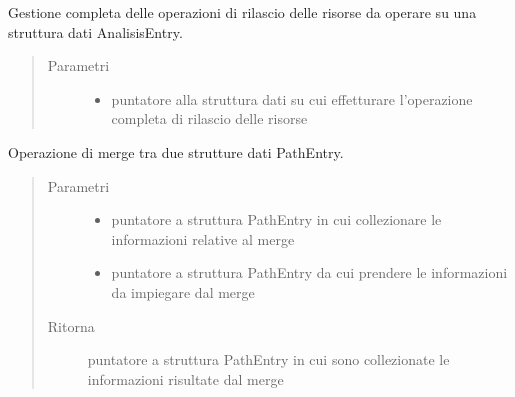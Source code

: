\documentclass[letterpaper,10pt,italian,openany,oneside]{sphinxmanual}
\begin{document}

\begin{fulllineitems}
\label{\detokenize{code/scan:c.freeAnalisis}}
Gestione completa delle operazioni di rilascio delle risorse da operare su una struttura dati AnalisisEntry.
\begin{quote}\begin{description}
\item[{Parametri}] \leavevmode\begin{itemize}
\item {} 
 \textendash{} puntatore alla struttura dati su cui effetturare l’operazione completa di rilascio delle risorse

\end{itemize}

\end{description}\end{quote}

\end{fulllineitems}


\begin{fulllineitems}
\label{\detokenize{code/scan:c.merge}}
Operazione di merge tra due strutture dati PathEntry.
\begin{quote}\begin{description}
\item[{Parametri}] \leavevmode\begin{itemize}
\item {} 
 \textendash{} puntatore a struttura PathEntry in cui collezionare le informazioni relative al merge

\item {} 
 \textendash{} puntatore a struttura PathEntry da cui prendere le informazioni da impiegare dal merge

\end{itemize}

\item[{Ritorna}] \leavevmode
puntatore a struttura PathEntry in cui sono collezionate le informazioni risultate dal merge

\end{description}\end{quote}

\end{fulllineitems}
\end{document}
